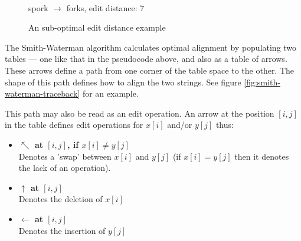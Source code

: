 \documentclass[a4paper,11pt,twoside,notitlepage]{article}
\newcommand\CellText[2]{%
          \node[texto,left=of mat#1,anchor=east]
          at (mat#1.west)
          {\large #2};
        }
\newcommand\SlText[2]{%
          \node[texto,left=of mat#1,anchor=west,rotate=50]
          at ([xshift=1.5ex,yshift=1ex]mat#1.north)
          {\large #2};
        }
\begin{document}
        \begin{figure}[h]
          \centering   
          \\
          \vspace{3 mm}
          spork $\rightarrow$ forks, edit distance: 7
          \caption{An sub-optimal edit distance example}
          \label{fig:fork-spork-subopt}
        \end{figure}

        The Smith-Waterman algorithm calculates optimal alignment by
        populating two tables --- one like that in the pseudocode
        above, and also as a table of arrows. These arrows define a
        path from one corner of the table space to the other. The
        shape of this path defines how to align the two
        strings.\cite{Smith1981} See figure
        \ref{fig:smith-waterman-traceback} for an example.

        This path may also be read as an edit operation. An arrow at
        the position $[i,j]$ in the table defines edit operations for
        $x[i]$ and/or $y[j]$ thus:
        \begin{itemize}
          \item \textbf{$\nwarrow$ at $[i,j]$, if $x[i] \neq y[j]$}
            \\ Denotes a 'swap' between $x[i]$ and $y[j]$ (if $x[i] =
            y[j]$ then it denotes the lack of an operation).
          \item \textbf{$\uparrow$ at $[i,j]$}\\Denotes the deletion
            of $x[i]$
          \item \textbf{$\leftarrow$ at $[i,j]$}\\Denotes the
            insertion of $y[j]$
        \end{itemize}
        
\end{document}
